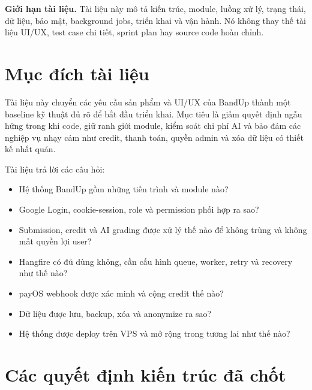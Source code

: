 \documentclass[11pt,a4paper]{article}
\begin{document}
\begin{importantbox}
\textbf{Giới hạn tài liệu.} Tài liệu này mô tả kiến trúc, module, luồng xử lý, trạng thái, dữ liệu, bảo mật, background jobs, triển khai và vận hành. Nó không thay thế tài liệu UI/UX, test case chi tiết, sprint plan hay source code hoàn chỉnh.
\end{importantbox}

\tableofcontents
\clearpage

\section*{Mục đích tài liệu}
Tài liệu này chuyển các yêu cầu sản phẩm và UI/UX của BandUp thành một baseline kỹ thuật đủ rõ để bắt đầu triển khai. Mục tiêu là giảm quyết định ngẫu hứng trong khi code, giữ ranh giới module, kiểm soát chi phí AI và bảo đảm các nghiệp vụ nhạy cảm như credit, thanh toán, quyền admin và xóa dữ liệu có thiết kế nhất quán.

Tài liệu trả lời các câu hỏi:
\begin{itemize}
  \item Hệ thống BandUp gồm những tiến trình và module nào?
  \item Google Login, cookie-session, role và permission phối hợp ra sao?
  \item Submission, credit và AI grading được xử lý thế nào để không trùng và không mất quyền lợi user?
  \item Hangfire có đủ dùng không, cần cấu hình queue, worker, retry và recovery như thế nào?
  \item payOS webhook được xác minh và cộng credit thế nào?
  \item Dữ liệu được lưu, backup, xóa và anonymize ra sao?
  \item Hệ thống được deploy trên VPS và mở rộng trong tương lai như thế nào?
\end{itemize}

\section{Các quyết định kiến trúc đã chốt}
\end{document}
